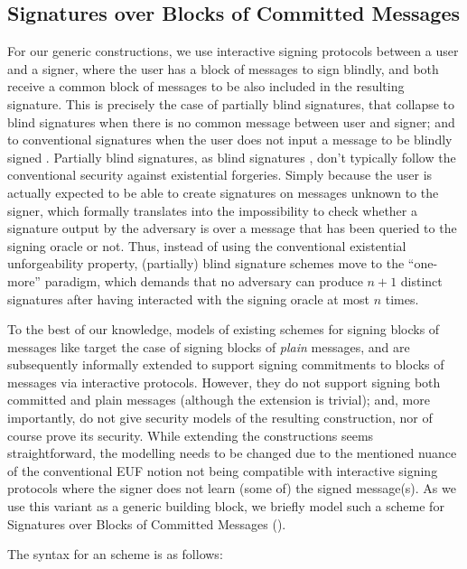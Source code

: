\subsection{Signatures over Blocks of Committed Messages}
\label{sapp:sbcm}

For our generic constructions, we use interactive signing protocols between a
user and a signer, where the user has a block of messages to sign blindly, and
both receive a common block of messages to be also included in the resulting
signature. This is precisely the case of partially blind signatures, that
collapse to blind signatures when there is no common message between user
and signer; and to conventional signatures when the user does not input a
message to be blindly signed \cite{ao00}. Partially blind signatures, as
blind signatures \cite{ps96}, don't typically follow the conventional security
against existential forgeries. Simply because the user is actually expected to
be able to create signatures on messages unknown to the signer, which formally
translates into the impossibility to check whether a signature output by the
adversary is over a message that has been queried to the signing oracle or not.
Thus, instead of using the conventional existential unforgeability property,
(partially) blind signature schemes move to the ``one-more'' paradigm, which
demands that no adversary can produce $n+1$ distinct signatures after having
interacted with the signing oracle at most $n$ times.

To the best of our knowledge, models of existing schemes for signing blocks of
messages like \cite{cl02,asm06,ps16,cdl16b} target the case of signing blocks
of \emph{plain} messages, and are subsequently informally extended to support
signing commitments to blocks of messages via interactive protocols. However,
they do not support signing both committed and plain messages (although the
extension is trivial); and, more importantly, do not give security models of
the resulting construction, nor of course prove its security. While extending
the constructions seems straightforward, the modelling needs to be changed due
to the mentioned nuance of the conventional EUF notion not being compatible with
interactive signing protocols where the signer does not learn (some of) the
signed message(s). As we use this variant as a generic building block,
we briefly model such a scheme for Signatures over Blocks of Committed Messages
(\SBCM).

The syntax for an \SBCM scheme is as follows:

